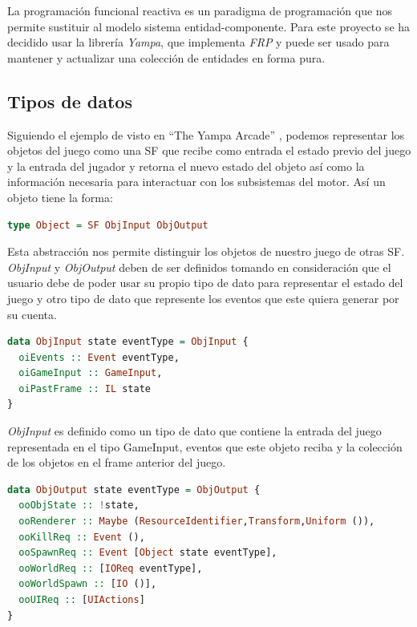 La programación funcional reactiva es un paradigma de programación que nos permite sustituir al modelo sistema entidad-componente. Para este proyecto se ha decidido usar la librería \emph{Yampa}, que implementa \emph{FRP} y puede ser usado para mantener y actualizar una colección de entidades en forma pura.

\subsection{Tipos de datos}

Siguiendo el ejemplo de visto en “The Yampa Arcade” \cite{Courtney2003b}, podemos representar los objetos del juego como una SF que recibe como entrada el estado previo del juego y la entrada del jugador y retorna el nuevo estado del objeto así como la información necesaria para interactuar con los subsistemas del motor. Así un objeto tiene la forma:

\begin{lstlisting}[label={ObjDef1},frame=single,language=Haskell]
type Object = SF ObjInput ObjOutput
\end{lstlisting}

Esta abstracción nos permite distinguir los objetos de nuestro juego de otras SF. \emph{ObjInput} y \emph{ObjOutput} deben de ser definidos tomando en consideración que el usuario debe de poder usar su propio tipo de dato para representar el estado del juego y otro tipo de dato que represente los eventos que este quiera generar por su cuenta.

\begin{lstlisting}[label={ObjInputDef},frame=single,language=Haskell]
data ObjInput state eventType = ObjInput {
  oiEvents :: Event eventType,
  oiGameInput :: GameInput,
  oiPastFrame :: IL state
}
\end{lstlisting}

\emph{ObjInput} es definido como un tipo de dato que contiene la entrada del juego representada en el tipo GameInput, eventos que este objeto reciba y la colección de los objetos en el frame anterior del juego.

\begin{lstlisting}[label={ObjOutputDef},frame=single,language=Haskell]
data ObjOutput state eventType = ObjOutput {
  ooObjState :: !state,
  ooRenderer :: Maybe (ResourceIdentifier,Transform,Uniform ()),
  ooKillReq :: Event (),
  ooSpawnReq :: Event [Object state eventType],
  ooWorldReq :: [IOReq eventType],
  ooWorldSpawn :: [IO ()],
  ooUIReq :: [UIActions]
}
\end{lstlisting}

